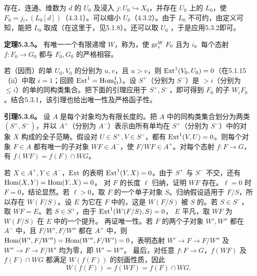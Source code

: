 存在、连通、维数为 $d$ 的 $U_0$ 及浸入 $j:U_0\hookrightarrow X_0$，并存在 $U_0$ 上的 $L_0$，使 $F_0=j_{!*}(L_0[d])$（4.3.1）。可以缩小 $U_0$（4.3.2）。由于 $L_0$ 不可约，由定义可知，能把 $L_0$ 取成（在这里于，见5.1.8）。还可以取 $U_0$ ，于是应用5.3.2即可。

\par\medskip\noindent\textbf{定理5.3.5。} 有唯一一个有限递增 $W$，称为，使 $\operatorname{gr}_i^WF_0$ 且为 $i$。每个态射 $f:F_0\to G_0$ 都与 $F_0,G_0$ 的严格相容。

若（因而）的单 $U_0,V_0$ 的分别为 $u,v$，且 $u>v$，则 $\operatorname{Ext}^1(V_0,U_0)=0$（在5.1.15（ii）中取 $i=1$；回顾 $\operatorname{Ext}^1=\operatorname{Hom}_{\mathrm{D}}^1$）。设 $S^+$（分别为 $S^-$）是
$>i$（分别为 $\le i$）的单的同构类集合。把下面的引理应用于 $S^+,S^-$，即可得到 $F_0$ 的子 $W_iF_0$。结合5.3.1，该引理也给出唯一性及严格函子性。

\par\medskip\noindent\textbf{引理5.3.6。} 设 $A$ 是每个对象均为有限长度的。把 $A$ 中的同构类集合划分为两类 $(S^+,S^-)$，并以 $A^+$（分别为 $A^-$）表示由所有单均在 $S^+$（分别为 $S^-$）中的对象 $X$ 构成的全子范畴。假设对 $U\in S^+,V\in S^-$，都有 $\operatorname{Ext}^1(V,U)=0$。则每个对象 $F\in A$ 都有唯一的子对象 $WF\in A^-$，使 $F/WF\in A^+$。对每个态射 $f:F\to G$，有 $f(WF)=f(F)\cap WG$。

若 $X\in A^+,Y\in A^-$，$\operatorname{Ext}$ 的表明 $\operatorname{Ext}^1(Y,X)=0$。由于 $S^+$ 与 $S^-$ 不交，还有 $\operatorname{Hom}(X,Y)=\operatorname{Hom}(Y,X)=0$。
对 $F$ 的长度 $\ell$ 归纳，证明 $WF$ 存在。$\ell=0$ 时 $F=0$，结论显然。若 $\ell>0$，取 $F$ 的一个单子对象 $S$。归纳假设适用于 $F/S$，所以存在 $W(F/S)$。设 $E$ 为它在 $F$ 中的，这是 $W(F/S)$ 被 $S$ 的。若 $S\in S^-$，取 $WF=E$。若 $S\in S^+$，由于 $\operatorname{Ext}^1(W(F/S),S)=0$， $E$ 平凡，取 $WF$ 为 $W(F/S)$ 在 $E$ 中的一个提升。
再证唯一性。若 $F$ 的两个子对象 $W',W''$ 都在 $A^-$ 中，且 $F/W',F/W''$ 都在 $A^+$ 中，则 $\operatorname{Hom}(W',F/W'')=\operatorname{Hom}(W'',F/W')=0$，表明态射 $W'\to F\to F/W''$ 及 $W''\to F\to F/W'$ 均为零，即 $W'=W''$。
最后，对任意 $f:F\to G$，$f(WF)$ 及 $f(F)\cap WG$ 都满足 $W(f(F))$ 的刻画性质，因此
\[
W(f(F))=f(WF)=f(F)\cap WG.
\]

